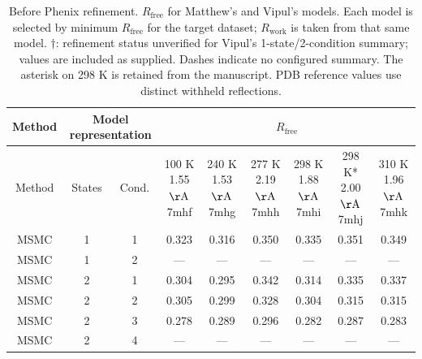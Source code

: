 \begin{table}[htbp]
\centering
\small
\begin{tabular}{|c|c|c|c|c|c|c|c|c|}
\hline
Method & \multicolumn{2}{c|}{Model representation} & \multicolumn{6}{c|}{$R_{\mathrm{free}}$} \\
\hline
Method & States & Cond. & \shortstack{100 K \\ 1.55 $\mathrm{\AA}$ \\ 7mhf} & \shortstack{240 K \\ 1.53 $\mathrm{\AA}$ \\ 7mhg} & \shortstack{277 K \\ 2.19 $\mathrm{\AA}$ \\ 7mhh} & \shortstack{298 K \\ 1.88 $\mathrm{\AA}$ \\ 7mhi} & \shortstack{298 K* \\ 2.00 $\mathrm{\AA}$ \\ 7mhj} & \shortstack{310 K \\ 1.96 $\mathrm{\AA}$ \\ 7mhk} \\
\hline
MSMC & 1 & 1 & 0.323 & 0.316 & 0.350 & 0.335 & 0.351 & 0.349 \\ \hline
MSMC & 1 & 2 & --- & --- & --- & --- & --- & --- \\ \hline
MSMC & 2 & 1 & 0.304 & 0.295 & 0.342 & 0.314 & 0.335 & 0.337 \\ \hline
MSMC & 2 & 2 & 0.305 & 0.299 & 0.328 & 0.304 & 0.315 & 0.315 \\ \hline
MSMC & 2 & 3 & 0.278 & 0.289 & 0.296 & 0.282 & 0.287 & 0.283 \\ \hline
MSMC & 2 & 4 & --- & --- & --- & --- & --- & --- \\ \hline
\end{tabular}
\caption{Before Phenix refinement. $R_{\mathrm{free}}$ for Matthew's and Vipul's models. Each model is selected by minimum $R_{\mathrm{free}}$ for the target dataset; $R_{\mathrm{work}}$ is taken from that same model. $\dagger$: refinement status unverified for Vipul's 1-state/2-condition summary; values are included as supplied. Dashes indicate no configured summary. The asterisk on 298 K is retained from the manuscript. PDB reference values use distinct withheld reflections.}
\label{tab:combined_before_phenix_r_free}
\end{table}
